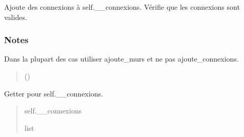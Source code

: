 \documentclass[letterpaper,10pt,french]{sphinxmanual}
\begin{document}
\begin{fulllineitems}
\begin{fulllineitems}
\end{fulllineitems}


\begin{fulllineitems}
\label{\detokenize{src:src.utilites.Noeud.ajoute_connexions}}
\pysigstartsignatures
{}
\pysigstopsignatures
\sphinxAtStartPar
Ajoute des connexions à self.\_\_connexions. Vérifie que les connexions sont valides.
\subsubsection*{Notes}

\sphinxAtStartPar
Dans la plupart des cas utiliser ajoute\_murs et ne pas ajoute\_connexions.
\begin{quote}\begin{description}
\sphinxAtStartPar
{} () \textendash{} 

\end{description}\end{quote}

\end{fulllineitems}


\begin{fulllineitems}
\label{\detokenize{src:src.utilites.Noeud.get_connexions}}
\pysigstartsignatures
{}
\pysigstopsignatures
\sphinxAtStartPar
Getter pour self.\_\_connexions.
\begin{quote}\begin{description}
\sphinxAtStartPar
self.\_\_connexions

\sphinxAtStartPar
list

\end{description}\end{quote}

\end{fulllineitems}


\end{fulllineitems}
\end{document}
